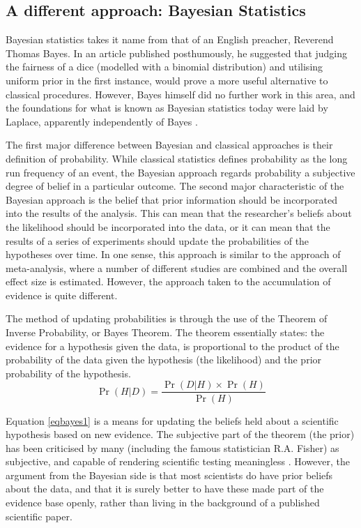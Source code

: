 \subsection{A different approach: Bayesian Statistics}

Bayesian statistics takes it name from that of an English preacher, Reverend Thomas Bayes. In an article published posthumously, he suggested that judging the fairness of a dice (modelled with a binomial distribution) and utilising uniform prior in the first instance, would prove a more useful alternative to classical procedures. However, Bayes himself did no further work in this area, and the foundations for what is known as Bayesian statistics today were laid by Laplace, apparently independently of Bayes \cite{stigler1986history}. 

The first major difference between Bayesian and classical approaches is their definition of probability. While classical statistics defines probability as the long run frequency of an event, the Bayesian approach regards probability a subjective degree of belief in a particular outcome. The second major characteristic of the Bayesian approach is the belief that prior information should be incorporated into the results of the analysis. This can mean that the researcher's beliefs about the likelihood should be incorporated into the data, or it can mean that the results of a series of experiments should update the probabilities of the hypotheses over time. In one sense, this approach is similar to the approach of meta-analysis, where a number of different studies are combined and the overall effect size is estimated. However, the approach taken to the accumulation of evidence is quite different. 

The method of updating probabilities is through the use of the Theorem of Inverse Probability, or Bayes Theorem. The theorem essentially states: the evidence for a hypothesis given the data, is proportional to the product of the probability of the data given the hypothesis (the likelihood) and the prior probability of the hypothesis. 
\begin{equation}
  \label{eq:bayes1}
  \Pr(H|D)=\frac{\Pr(D| H)\times\Pr(H)}{\Pr(H)}
\end{equation}

Equation \ref{eqbayes1} is  a means for updating the beliefs held about a scientific hypothesis based on new evidence. The subjective part of the theorem (the prior) has been criticised by many (including the famous statistician R.A. Fisher) as subjective, and capable of rendering scientific testing meaningless \cite{salsburg2002lady}. However, the argument from the Bayesian side is that most scientists do have prior beliefs about the data, and that it is surely better to have these made part of the evidence base openly, rather than living in the background of a published scientific paper\cite{gill2002bayesian}. 

